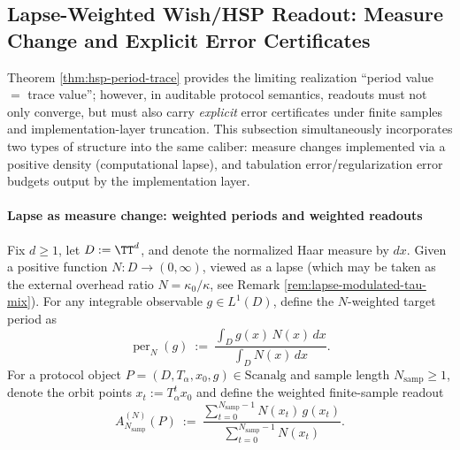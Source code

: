 \subsection{Lapse-Weighted Wish/HSP Readout: Measure Change and Explicit Error Certificates}\label{app:op-algebra-wish-lapse}
Theorem \ref{thm:hsp-period-trace} provides the limiting realization ``period value \(=\) trace value''; however, in auditable protocol semantics, readouts must not only converge, but must also carry \emph{explicit} error certificates under finite samples and implementation-layer truncation.
This subsection simultaneously incorporates two types of structure into the same caliber: measure changes implemented via a positive density (computational lapse), and tabulation error/regularization error budgets output by the implementation layer.

\paragraph{Lapse as measure change: weighted periods and weighted readouts}
Fix \(d\ge 1\), let \(D:=\TT^d\), and denote the normalized Haar measure by \(dx\).
Given a positive function \(N:D\to(0,\infty)\), viewed as a lapse (which may be taken as the external overhead ratio \(N=\kappa_0/\kappa\), see Remark \ref{rem:lapse-modulated-tau-mix}).
For any integrable observable \(g\in L^1(D)\), define the \(N\)-weighted target period as
\begin{equation}\label{eq:op-algebra-perN-def}
\operatorname{per}_{N}(g)
~:=~
\frac{\int_{D} g(x)\,N(x)\,dx}{\int_{D} N(x)\,dx}.
\end{equation}
For a protocol object \(P=(D,T_\alpha,x_0,g)\in\mathrm{Scanalg}\) and sample length \(N_{\mathrm{samp}}\ge 1\), denote the orbit points \(x_t:=T_\alpha^t x_0\) and define the weighted finite-sample readout
\begin{equation}\label{eq:op-algebra-weighted-readout-def}
A^{(N)}_{N_{\mathrm{samp}}}(P)
~:=~
\frac{\sum_{t=0}^{N_{\mathrm{samp}}-1} N(x_t)\,g(x_t)}{\sum_{t=0}^{N_{\mathrm{samp}}-1} N(x_t)}.
\end{equation}

